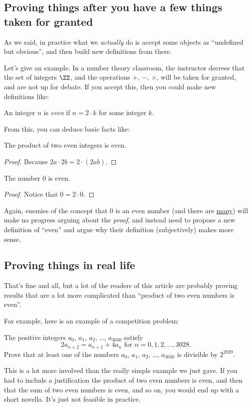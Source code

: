 \documentclass[11pt]{scrartcl}
\begin{document}
\subsection{Proving things after you have a few things taken for granted}
As we said, in practice what we \emph{actually} do is
accept some objects as ``undefined but obvious'',
and then build new definitions from there.

Let's give an example.
In a number theory classroom, the instructor decrees that the
set of integers $\ZZ$, and the operations $+$, $-$, $\times$,
will be taken for granted, and are not up for debate.
If you accept this, then you could make new definitions like:
\begin{definition}
  An integer $n$ is \emph{even} if $n = 2 \cdot k$ for some integer $k$.
\end{definition}
From this, you can deduce basic facts like:
\begin{fact}
The product of two even integers is even.
\end{fact}
\begin{proof}
Because $2a \cdot 2b = 2 \cdot (2ab)$.
\end{proof}
\begin{fact}
  The number $0$ is even.
\end{fact}
\begin{proof}
  Notice that $0 = 2 \cdot 0$.
\end{proof}
Again, enemies of the concept that $0$ is an even number
(and there are \href{https://en.wikipedia.org/wiki/Parity_of_zero}{many})
will make no progress arguing about the \emph{proof},
and instead need to propose a new definition of ``even''
and argue why their definition (subjectively) makes more sense.

\subsection{Proving things in real life}
That's fine and all, but a lot of the readers of this article
are probably proving results that are a lot more complicated than
``product of two even numbers is even''.

For example, here is an example of a competition problem:
\begin{problem}
The positive integers $a_0$, $a_1$, $a_2$, \dots, $a_{3030}$ satisfy
\[ 2a_{n + 2} = a_{n + 1} + 4a_n \text{ for } n = 0, 1, 2, \ldots, 3028.  \]
Prove that at least one of the numbers
$a_0$, $a_1$, $a_2$, \dots, $a_{3030}$ is divisible by $2^{2020}$.
\end{problem}
This is a lot more involved than the really simple example we just gave.
If you had to include a justification the product of two even numbers is
even, and then that the sum of two even numbers is even, and so on,
you would end up with a short novella.
It's just not feasible in practice.
\end{document}

